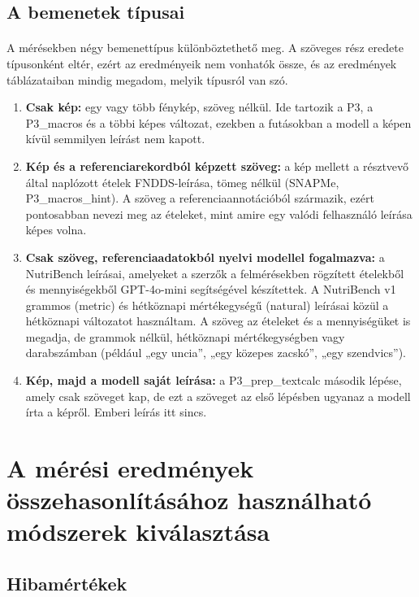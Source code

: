 \subsection{A bemenetek típusai}
\label{sec:bemenet_tipusok}
\paragraph{}A mérésekben négy bemenettípus különböztethető meg. A szöveges rész eredete 
típusonként eltér, ezért az eredményeik nem vonhatók össze, és az eredmények táblázataiban 
mindig megadom, melyik típusról van szó.
\begin{enumerate}
    \item \textbf{Csak kép:} egy vagy több fénykép, szöveg nélkül. Ide tartozik a P3, a P3\_macros 
    és a többi képes változat, ezekben a futásokban a modell a képen kívül semmilyen leírást nem kapott.
    \item \textbf{Kép és a referenciarekordból képzett szöveg:} a kép mellett a résztvevő által 
    naplózott ételek FNDDS-leírása, tömeg nélkül (SNAPMe, P3\_macros\_hint). 
    A szöveg a referenciaannotációból származik, ezért pontosabban nevezi meg az ételeket, mint 
    amire egy valódi felhasználó leírása képes volna.
    \item \textbf{Csak szöveg, referenciaadatokból nyelvi modellel fogalmazva:} a NutriBench 
    leírásai, amelyeket a szerzők a felmérésekben rögzített ételekből és mennyiségekből 
    GPT-4o-mini segítségével készítettek. A NutriBench v1 grammos (metric) és hétköznapi 
    mértékegységű (natural) leírásai közül a hétköznapi változatot használtam. A szöveg az ételeket és a mennyiségüket 
    is megadja, de grammok nélkül, hétköznapi mértékegységben vagy darabszámban (például „egy 
    uncia”, „egy közepes zacskó”, „egy szendvics”).
    \item \textbf{Kép, majd a modell saját leírása:} a P3\_prep\_textcalc második lépése, amely 
    csak szöveget kap, de ezt a szöveget az első lépésben ugyanaz a modell írta a képről. Emberi 
    leírás itt sincs.
\end{enumerate}


\section{A mérési eredmények összehasonlításához használható módszerek kiválasztása}

\subsection{Hibamértékek}
\label{sec:hibamertekek}


